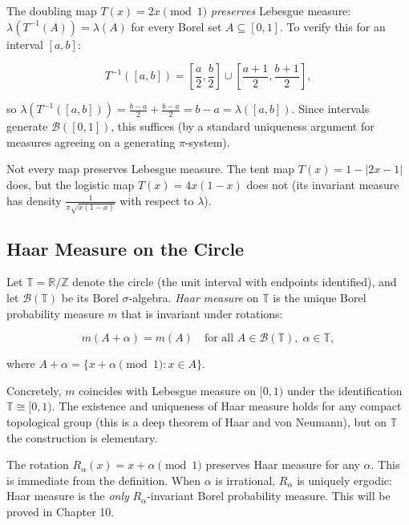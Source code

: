 \begin{example}
The doubling map $T(x) = 2x \pmod{1}$ \textit{preserves} Lebesgue measure: $\lambda(T^{-1}(A)) = \lambda(A)$ for every Borel set $A \subseteq [0,1]$. To verify this for an interval $[a,b]$:

\[
T^{-1}([a,b]) = \left[\frac{a}{2}, \frac{b}{2}\right] \cup \left[\frac{a+1}{2}, \frac{b+1}{2}\right],
\]

so $\lambda(T^{-1}([a,b])) = \frac{b-a}{2} + \frac{b-a}{2} = b - a = \lambda([a,b])$. Since intervals generate $\mathcal{B}([0,1])$, this suffices (by a standard uniqueness argument for measures agreeing on a generating $\pi$-system).

Not every map preserves Lebesgue measure. The tent map $T(x) = 1 - |2x - 1|$ does, but the logistic map $T(x) = 4x(1-x)$ does not (its invariant measure has density $\frac{1}{\pi\sqrt{x(1-x)}}$ with respect to $\lambda$).
\end{example}


\subsection{Haar Measure on the Circle}\label{sec:7.8.2}

Let $\mathbb{T} = \mathbb{R}/\mathbb{Z}$ denote the circle (the unit interval with endpoints identified), and let $\mathcal{B}(\mathbb{T})$ be its Borel $\sigma$-algebra. \textit{Haar measure} on $\mathbb{T}$ is the unique Borel probability measure $m$ that is invariant under rotations:

\[
m(A + \alpha) = m(A) \quad \text{for all } A \in \mathcal{B}(\mathbb{T}), \; \alpha \in \mathbb{T},
\]

where $A + \alpha = \{x + \alpha \pmod{1} : x \in A\}$.

Concretely, $m$ coincides with Lebesgue measure on $[0,1)$ under the identification $\mathbb{T} \cong [0,1)$. The existence and uniqueness of Haar measure holds for any compact topological group (this is a deep theorem of Haar and von Neumann), but on $\mathbb{T}$ the construction is elementary.

\begin{example}
The rotation $R_\alpha(x) = x + \alpha \pmod{1}$ preserves Haar measure for any $\alpha$. This is immediate from the definition. When $\alpha$ is irrational, $R_\alpha$ is uniquely ergodic: Haar measure is the \textit{only} $R_\alpha$-invariant Borel probability measure. This will be proved in Chapter 10.
\end{example}


